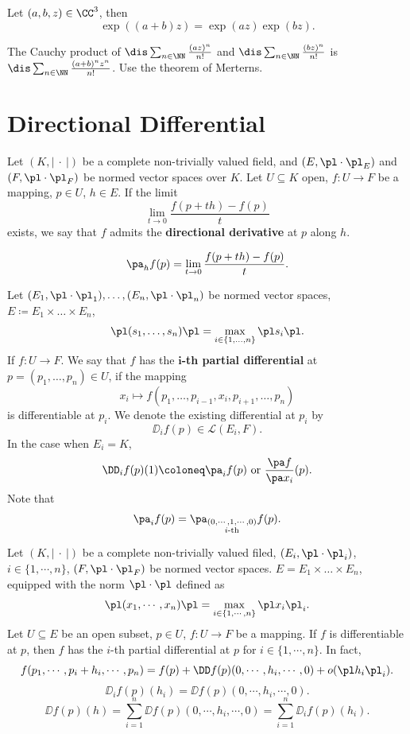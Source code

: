 \begin{propositionenv}
    Let $(a,b,z)\in \CC^3$, then
    $$ \exp((a+b)z)=\exp(az)\exp(bz).$$
\end{propositionenv}
\begin{proofenv}
    The Cauchy product of $\dis \sum_{n\in\NN}\frac{(az)^n}{n!}$ and $\dis \sum_{n\in\NN}\frac{(bz)^n}{n!}$ is $\dis \sum_{n\in\NN}\frac{(a+b)^nz^n}{n!}$. Use the theorem of Merterns.
\end{proofenv}

\section{Directional Differential}
\begin{definitionenv}
    Let $(K,\left|\ \cdot\ \right|)$ be a complete non-trivially valued field, and $(E,\pl\cdot\pl_E)$ and $(F,\pl\cdot\pl_F)$ be normed vector spaces over $K$. Let $U\subseteq K$ open, $f:U\longrightarrow F$ be a mapping, $p\in U$, $h\in E$.
    If the limit 
    $$ \lim_{t\rightarrow 0} \frac{f(p+th)-f(p)}{t}$$
    exists, we say that $f$ admits the \textbf{directional derivative} at $p$ along $h$.
\end{definitionenv}
\begin{notationenv}
    $$ \pa_h f(p)= \lim_{t\rightarrow 0} \frac{f(p+th)-f(p)}{t}.$$
\end{notationenv}
\begin{definitionenv}
    Let $(E_1,\pl\cdot\pl_1),\ldots,(E_n,\pl\cdot\pl_n)$ be normed vector spaces, $E\coloneq E_1\times\dots\times E_n$,
    $$ \pl (s_1,\ldots,s_n)\pl=\max_{i\in \{1,\ldots,n\}}\pl s_i\pl.$$
    If $f: U\longrightarrow F$. We say that $f$ has the \textbf{$\mathbf{i}$-th partial differential} at $p=(p_1,\ldots,p_n)\in U$, if the mapping
    $$ x_i\longmapsto f(p_1,\ldots,p_{i-1},x_i,p_{i+1},\ldots,p_n)$$
    is differentiable at $p_i$. We denote the existing differential at $p_i$ by
    $$ \DD_i f(p)\in \mathscr{L}(E_i,F).$$
    In the case when $E_i=K$,
    $$ \DD_i f(p)(1)\coloneq \pa_i f(p) \text{ or }\frac{\pa f}{\pa x_i}(p).$$
    Note that
    $$\pa_i f(p)= \pa_{\substack{(0,\cdots,1,\cdots,0)\\ i\text{-th}}}f(p).$$
\end{definitionenv}
\begin{remark}
    Let $(K,\left| \ \cdot\ \right|)$ be a complete non-trivially valued filed, $(E_i,\pl\cdot\pl_i)$, $i\in\{1,\cdots,n\}$, $(F,\pl\cdot\pl_F)$ be normed vector spaces. $E=E_1\times\dots\times E_n$, equipped with the norm $\pl\cdot\pl$ defined as
    $$ \pl (x_1,\cdots,x_n)\pl=\max_{i\in \{1,\cdots,n\}}\pl x_i\pl_i.$$
    Let $U\subseteq E$ be an open subset, $p\in U$, $f:U\longrightarrow F$ be a mapping. If $f$ is differentiable at $p$, then $f$ has the $i$-th partial differential at $p$ for $i\in\{1,\cdots,n\}$.
    In fact,
    $$ f(p_1,\cdots,p_i+h_i,\cdots,p_n)=f(p)+\DD f(p)(0,\cdots,h_i,\cdots,0)+o(\pl h_i\pl_i).$$
    $$ \DD_i f(p)(h_i)=\DD f(p)(0,\cdots,h_i,\cdots,0).$$
    $$ \DD f(p)(h)=\sum_{i=1}^n \DD f(p)(0,\cdots,h_i,\cdots,0)=\sum_{i=1}^n \DD_i f(p)(h_i).$$
\end{remark}
